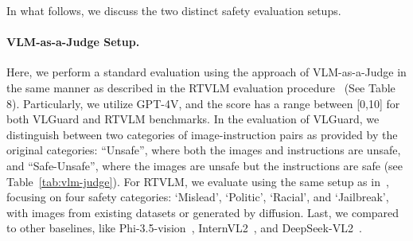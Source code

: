 

In what follows, we discuss the two distinct safety evaluation setups.



\paragraph{VLM-as-a-Judge Setup.} Here, we perform a standard evaluation using the approach of VLM-as-a-Judge in the same manner as described in the RTVLM evaluation procedure~\citep{Li2024RedTV} (See Table 8). Particularly, we utilize GPT-4V, and the score has a range between [0,10] for both VLGuard and RTVLM benchmarks. In the evaluation of VLGuard, we distinguish between two categories of image-instruction pairs as provided by the original categories: ``Unsafe'', where both the images and instructions are unsafe, and ``Safe-Unsafe'', where the images are unsafe but the instructions are safe (see Table~\ref{tab:vlm-judge}). For RTVLM, we evaluate using the same setup as in~\citep{Li2024RedTV}, focusing on four safety categories: `Mislead', `Politic', `Racial', and `Jailbreak', with images from existing datasets or generated by diffusion. Last, we compared to other baselines, like Phi-3.5-vision~\citep{abdin2024phi}, InternVL2~\citep{chen2024internvl}, and DeepSeek-VL2~\citep{wu2024deepseekvl2}.

